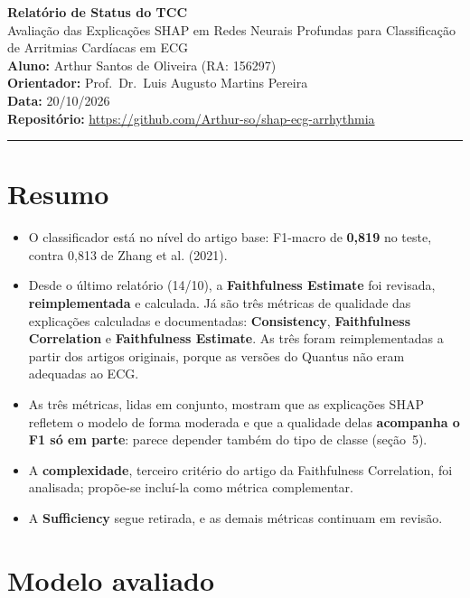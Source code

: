 \documentclass[11pt,a4paper]{article}
\begin{document}
\begin{center}
    {\LARGE \textbf{Relatório de Status do TCC}} \\[0.35em]
    {\large Avaliação das Explicações SHAP em Redes Neurais Profundas para Classificação de Arritmias Cardíacas em ECG} \\[0.3em]
    \textbf{Aluno:} Arthur Santos de Oliveira (RA: 156297) \\[0.2em]
    \textbf{Orientador:} Prof.\ Dr.\ Luis Augusto Martins Pereira \\[0.2em]
    \textbf{Data:} 20/10/2026 \\[0.2em]
    \textbf{Repositório:} \url{https://github.com/Arthur-so/shap-ecg-arrhythmia}
\end{center}
\vspace{-0.5em}
\hrule
\vspace{0.8em}

\section{Resumo}

\begin{itemize}
    \item O classificador está no nível do artigo base: F1-macro de \textbf{0,819} no teste, contra 0,813 de Zhang et al. (2021).
    \item Desde o último relatório (14/10), a \textbf{Faithfulness Estimate} foi revisada, \textbf{reimplementada} e calculada. Já são três métricas de qualidade das explicações calculadas e documentadas: \textbf{Consistency}, \textbf{Faithfulness Correlation} e \textbf{Faithfulness Estimate}. As três foram reimplementadas a partir dos artigos originais, porque as versões do Quantus não eram adequadas ao ECG.
    \item As três métricas, lidas em conjunto, mostram que as explicações SHAP refletem o modelo de forma moderada e que a qualidade delas \textbf{acompanha o F1 só em parte}: parece depender também do tipo de classe (seção~5).
    \item A \textbf{complexidade}, terceiro critério do artigo da Faithfulness Correlation, foi analisada; propõe-se incluí-la como métrica complementar.
    \item A \textbf{Sufficiency} segue retirada, e as demais métricas continuam em revisão.
\end{itemize}

\section{Modelo avaliado}
\end{document}
